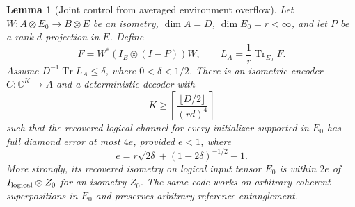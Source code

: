 \documentclass[11pt]{article}
\newtheorem{lemma}[theorem]{Lemma}
\newcommand{\Tr}{\operatorname{Tr}}
\begin{document}
\begin{lemma}[Joint control from averaged environment overflow]\label{lem:uniformcompression}
Let $W:A\otimes E_0\to B\otimes E$ be an isometry, $\dim A=D$, $\dim E_0=r<\infty$, and let $P$ be a rank-$d$ projection in $E$. Define
\[
 F=W^*(I_B\otimes(I-P))W,\qquad L_A=\frac1r\Tr_{E_0}F.
\]
Assume $D^{-1}\Tr L_A\le\delta$, where $0<\delta<1/2$. There is an isometric encoder $C:\mathbb C^K\to A$ and a deterministic decoder with
\begin{equation}
 K\ge\left\lceil\frac{\lfloor D/2\rfloor}{(rd)^4}\right\rceil
 \label{eq:Kcompress}
\end{equation}
such that the recovered logical channel for every initializer supported in $E_0$ has full diamond error at most $4e$, provided $e<1$, where
\begin{equation}
 e=r\sqrt{2\delta}+(1-2\delta)^{-1/2}-1.
 \label{eq:ecompress}
\end{equation}
More strongly, its recovered isometry on logical input tensor $E_0$ is within $2e$ of $I_{\rm logical}\otimes Z_0$ for an isometry $Z_0$. The same code works on arbitrary coherent superpositions in $E_0$ and preserves arbitrary reference entanglement.
\end{lemma}
\end{document}
